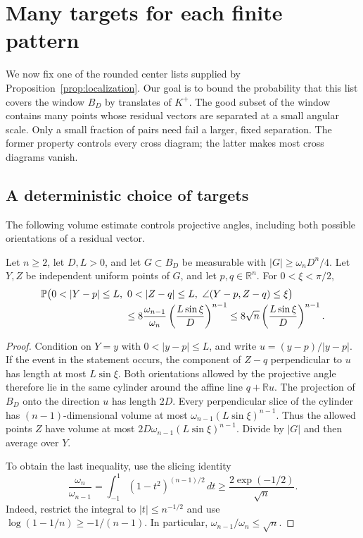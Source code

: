 \section{Many targets for each finite pattern}
\label{sec:targets}

We now fix one of the rounded center lists supplied by
Proposition~\ref{prop:localization}.  Our goal is to bound the probability
that this list covers the window $B_D$ by translates of $K^+$.
The good subset of the window contains many points whose residual vectors
are separated at a small angular scale.  Only a small fraction of pairs
need fail a larger, fixed separation.  The former property controls every
cross diagram; the latter makes most cross diagrams vanish.

\subsection{A deterministic choice of targets}

The following volume estimate controls projective angles, including both
possible orientations of a residual vector.

\begin{lemma}
\label{lem:cylinder}
Let $n\ge2$, let $D,L>0$, and let $G\subset B_D$ be measurable with
$|G|\ge\omega_nD^n/4$.  Let $Y,Z$ be independent uniform points of $G$,
and let $p,q\in\mathbb R^n$.  For $0<\xi<\pi/2$,
\begin{align}
&\mathbb P\bigl(0<|Y-p|\le L,\ 0<|Z-q|\le L,
                 \ \angle(Y-p,Z-q)\le\xi\bigr)
\notag\\[-2pt]
&\hspace{30mm}\le
 8\frac{\omega_{n-1}}{\omega_n}
       \left(\frac{L\sin\xi}{D}\right)^{n-1}
 \le 8\sqrt n\left(\frac{L\sin\xi}{D}\right)^{n-1}.
\label{eq:cylinder}
\end{align}
\end{lemma}

\begin{proof}
Condition on $Y=y$ with $0<|y-p|\le L$, and write
$u=(y-p)/|y-p|$.  If the event in the statement occurs, the component
of $Z-q$ perpendicular to $u$ has length at most $L\sin\xi$.
Both orientations allowed by the projective angle therefore lie in the
same cylinder around the affine line $q+\mathbb Ru$.
The projection of $B_D$ onto the direction $u$ has length $2D$.
Every perpendicular slice of the cylinder has $(n-1)$-dimensional volume
at most $\omega_{n-1}(L\sin\xi)^{n-1}$.  Thus the allowed points $Z$
have volume at most $2D\omega_{n-1}(L\sin\xi)^{n-1}$.
Divide by $|G|$ and then average over $Y$.

To obtain the last inequality, use the slicing identity
\[
 \frac{\omega_n}{\omega_{n-1}}
 =\int_{-1}^1(1-t^2)^{(n-1)/2}\,dt
 \ge\frac{2\exp(-1/2)}{\sqrt n}.
\]
Indeed, restrict the integral to $|t|\le n^{-1/2}$ and use
$\log(1-1/n)\ge-1/(n-1)$.  In particular,
$\omega_{n-1}/\omega_n\le\sqrt n$.
\end{proof}

